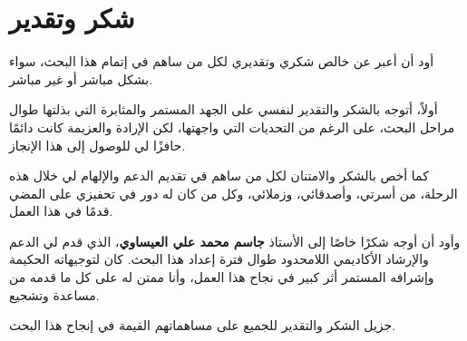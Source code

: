 \chapter*{شكر وتقدير}

\begin{doublespacing}
	\begin{center}
	
أود أن أعبر عن خالص شكري وتقديري لكل من ساهم في إتمام هذا البحث، سواء بشكل مباشر أو غير مباشر.

أولاً، أتوجه بالشكر والتقدير لنفسي على الجهد المستمر والمثابرة التي بذلتها طوال مراحل البحث، على الرغم من التحديات التي واجهتها، لكن الإرادة والعزيمة كانت دائمًا حافزًا لي للوصول إلى هذا الإنجاز.

كما أخص بالشكر والامتنان لكل من ساهم في تقديم الدعم والإلهام لي خلال هذه الرحلة، من أسرتي، وأصدقائي، وزملائي، وكل من كان له دور في تحفيزي على المضي قدمًا في هذا العمل.

وأود أن أوجه شكرًا خاصًا إلى الأستاذ \textbf{جاسم محمد علي العيساوي}، الذي قدم لي الدعم والإرشاد الأكاديمي اللامحدود طوال فترة إعداد هذا البحث. كان لتوجيهاته الحكيمة وإشرافه المستمر أثر كبير في نجاح هذا العمل، وأنا ممتن له على كل ما قدمه من مساعدة وتشجيع.

جزيل الشكر والتقدير للجميع على مساهماتهم القيمة في إنجاح هذا البحث.
\end{center}
\end{doublespacing}
